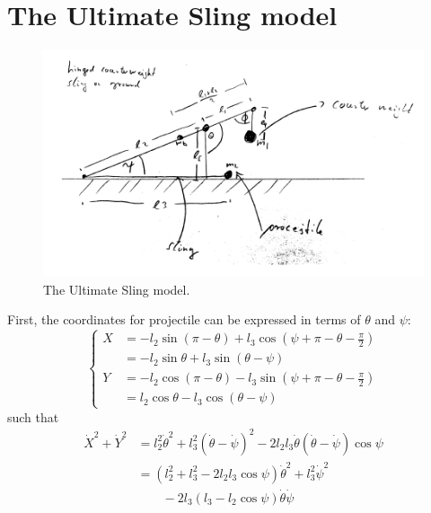 \documentclass[%
reprint,
amsmath,amssymb,
aps,
]{revtex4-1}
\begin{document}
	\section{The Ultimate Sling model}
	\begin{figure}[h]
		\centering
		\includegraphics[scale=0.25]{ult.png}
		\caption{The Ultimate Sling model.}
		\label{ultfig}
	\end{figure}
	First, the coordinates for projectile can be expressed in terms of $\theta$ and $\psi$:
	\begin{equation}\label{XYY}
	\left\{
	\begin{aligned}
	X &= -l_2\sin(\pi - \theta) + l_3\cos(\psi+\pi-\theta - \frac{\pi}{2})\\
	& = -l_2\sin\theta + l_3\sin(\theta - \psi)\\
	Y &= -l_2\cos(\pi - \theta)
	- l_3\sin(\psi+\pi-\theta - \frac{\pi}{2})\\
	&=l_2\cos \theta 
	- l_3\cos(\theta - \psi)
	\end{aligned}
	\right.
	\end{equation}
	such that
	\begin{equation}\label{dXdY}
	\begin{aligned}
	\dot{X}^2+ \dot{Y}^2
	&=
	l_2^2\dot{\theta}^2+l_3^2(\dot{\theta}-\dot{\psi})^2
	-
	2l_2l_3\dot{\theta}(\dot{\theta}-\dot{\psi})\cos\psi
	\\
	&=
	(l_2^2+l_3^2-2l_2l_3\cos\psi)\dot{\theta}^2
	+l_3^2\dot{\psi}^2\\
	&\qquad
	-
	2l_3(l_3 - l_2\cos\psi)\dot{\theta}\dot{\psi}
	\end{aligned}
	\end{equation}
	
\end{document}

